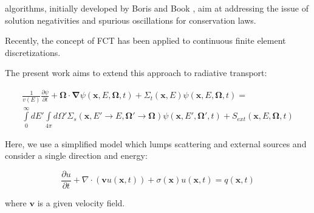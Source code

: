  algorithms, 
initially developed by Boris and Book \cite{borisbook}, aim at addressing  the issue of solution negativities and spurious oscillations for conservation laws.

Recently, the concept of FCT has been applied to continuous finite element discretizations.

The present work aims to extend this approach to radiative transport:

\begin{multline}
  \frac{1}{v(E)}\frac{\partial\psi}{\partial t}
  + \mathbf{\Omega}\cdot\mathbf{\nabla}\psi(\mathbf{x},E,\mathbf{\Omega},t)
	+ \Sigma_t(\mathbf{x},E)\psi(\mathbf{x},E,\mathbf{\Omega},t)
  = \\
  \int\limits_0^\infty dE'\int\limits_{4\pi}d\Omega'\Sigma_s(\mathbf{x},
    E'\rightarrow E,\mathbf{\Omega}'\rightarrow\mathbf{\Omega})
    \psi(\mathbf{x},E',\mathbf{\Omega}',t)
  + S_{ext}(\mathbf{x},E,\mathbf{\Omega},t)
\end{multline}

Here, we use a simplified model which lumps scattering and external sources and consider a single direction and energy:

\begin{equation}\label{eq:tr}
\boxed{
  \ \frac{\partial u}{\partial t} + \nabla\cdot(\mathbf{v}u(\mathbf{x},t))
  + \sigma(\mathbf{x})u(\mathbf{x},t) = q(\mathbf{x},t) \ 
}
\end{equation}

where $\mathbf{v}$ is a given velocity field. 


